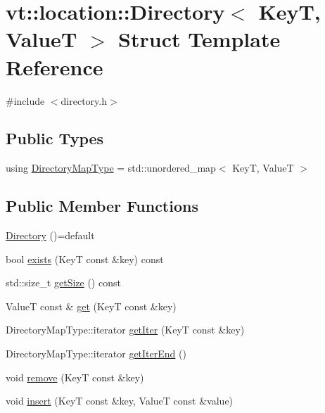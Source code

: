 \hypertarget{structvt_1_1location_1_1_directory}{}\section{vt\+:\+:location\+:\+:Directory$<$ KeyT, ValueT $>$ Struct Template Reference}
\label{structvt_1_1location_1_1_directory}


{\ttfamily \#include $<$directory.\+h$>$}

\subsection*{Public Types}
\begin{DoxyCompactItemize}
\item 
using \hyperlink{structvt_1_1location_1_1_directory_a6a897ff3929eccb2d334eb0b87b53f57}{Directory\+Map\+Type} = std\+::unordered\+\_\+map$<$ KeyT, ValueT $>$
\end{DoxyCompactItemize}
\subsection*{Public Member Functions}
\begin{DoxyCompactItemize}
\item 
\hyperlink{structvt_1_1location_1_1_directory_a166cb46d3274d1bc09e4b852d70172af}{Directory} ()=default
\item 
bool \hyperlink{structvt_1_1location_1_1_directory_aec1cbff73a72fb1be6825bd048f69601}{exists} (KeyT const \&key) const
\item 
std\+::size\+\_\+t \hyperlink{structvt_1_1location_1_1_directory_aa5725f97f3444efc18c8745b747545ac}{get\+Size} () const
\item 
ValueT const  \& \hyperlink{structvt_1_1location_1_1_directory_a7d3271252e69fd8c2c16c702b032bdc8}{get} (KeyT const \&key)
\item 
Directory\+Map\+Type\+::iterator \hyperlink{structvt_1_1location_1_1_directory_ae54fc683860dbfd4145012b93332d70c}{get\+Iter} (KeyT const \&key)
\item 
Directory\+Map\+Type\+::iterator \hyperlink{structvt_1_1location_1_1_directory_a7960b610e733ac8df4417a6181e32fe1}{get\+Iter\+End} ()
\item 
void \hyperlink{structvt_1_1location_1_1_directory_a85c59bd87eecbfabcbd7941e1c1929ae}{remove} (KeyT const \&key)
\item 
void \hyperlink{structvt_1_1location_1_1_directory_a9c4f1322988eb75cb7abd13d977b315f}{insert} (KeyT const \&key, ValueT const \&value)
\end{DoxyCompactItemize}


